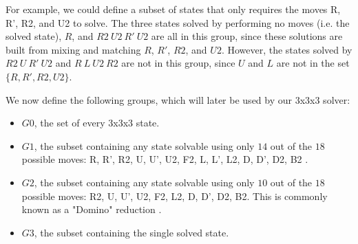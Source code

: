 \documentclass{article}
\begin{document}
For example, we could define a subset of states that only requires the moves R, R', R2, and U2 to solve. The three states solved by performing no moves (i.e. the solved state), $R$, and $R2\ U2\ R'\ U2$ are all in this group, since these solutions are built from mixing and matching $R$, $R'$, $R2$, and $U2$. However, the states solved by $R2\ U\ R'\ U2$ and $R\ L\ U2\ R2$ are not in this group, since $U$ and $L$ are not in the set $\{R, R', R2, U2\}$.




We now define the following groups, which will later be used by our 3x3x3 solver:

\begin{itemize}
    \item $G0$, the set of every 3x3x3 state.
    \item $G1$, the subset containing any state solvable using only $14$ out of the $18$ possible moves: R, R', R2, U, U', U2, F2, L, L', L2, D, D', D2, B2 \cite{eo}.
    \item $G2$, the subset containing any state solvable using only $10$ out of the $18$ possible moves: R2, U, U', U2, F2, L2, D, D', D2, B2. This is commonly known as a "Domino" reduction \cite{domino}.
    \item $G3$, the subset containing the single solved state.
\end{itemize}
\end{document}
